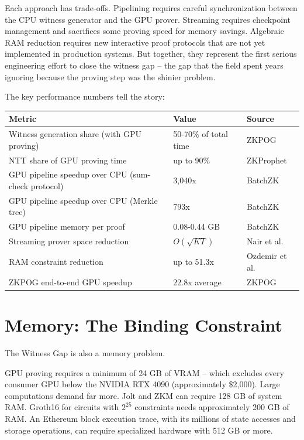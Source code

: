 \documentclass[
  11pt,
  openany]{report}
\begin{document}
Each approach has trade-offs. Pipelining requires careful synchronization
between the CPU witness generator and the GPU prover. Streaming requires
checkpoint management and sacrifices some proving speed for memory savings.
Algebraic RAM reduction requires new interactive proof protocols that are not
yet implemented in production systems. But together, they represent the first
serious engineering effort to close the witness gap -- the gap that the field
spent years ignoring because the proving step was the shinier problem.

The key performance numbers tell the story:

\begin{longtable}[]{@{}lll@{}}
\toprule\noalign{}
Metric & Value & Source \\
\midrule\noalign{}
\arrayrulecolor{MidnightBlue}\midrule\arrayrulecolor{MidnightBorder}
\endhead
\bottomrule\noalign{}
\endlastfoot
Witness generation share (with GPU proving) & 50-70\% of total time & ZKPOG \\
NTT share of GPU proving time & up to 90\% & ZKProphet \\
GPU pipeline speedup over CPU (sum-check protocol) & 3,040x & BatchZK \\
GPU pipeline speedup over CPU (Merkle tree) & 793x & BatchZK \\
GPU pipeline memory per proof & 0.08-0.44 GB & BatchZK \\
Streaming prover space reduction & \(O(\sqrt{KT})\) & Nair et al. \\
RAM constraint reduction & up to 51.3x & Ozdemir et al. \\
ZKPOG end-to-end GPU speedup & 22.8x average & ZKPOG \\
\end{longtable}

\section{Memory: The Binding Constraint}\label{memory-the-binding-constraint}

The Witness Gap is also a memory problem.

GPU proving requires a minimum of 24 GB of VRAM -- which excludes every consumer
GPU below the NVIDIA RTX 4090 (approximately \$2,000). Large computations demand
far more. Jolt and ZKM can require 128 GB of system RAM. Groth16 for circuits
with \(2^{25}\) constraints needs approximately 200 GB of RAM. An Ethereum block
execution trace, with its millions of state accesses and storage operations, can
require specialized hardware with 512 GB or more.
\end{document}
